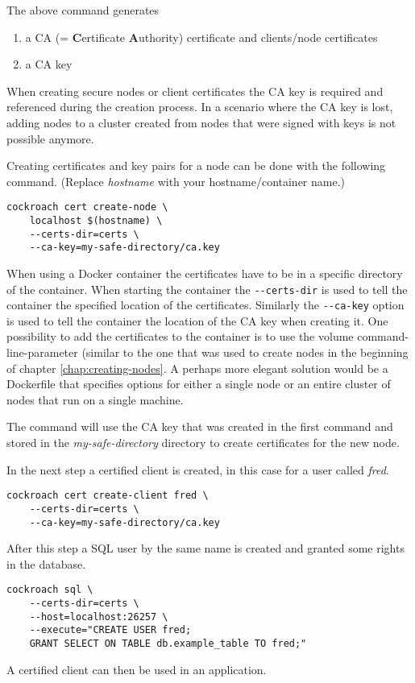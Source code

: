 The above command generates 
\begin{enumerate}
    \item a CA (= \textbf{C}ertificate \textbf{A}uthority) certificate and clients/node certificates
    \item a CA key 
\end{enumerate}

When creating secure nodes or client certificates the CA key is required and referenced during the creation process.
In a scenario where the CA key is lost, adding nodes to a cluster created from nodes that were signed with keys is not possible anymore.

\medskip
Creating certificates and key pairs for a node can be done with the following command. (Replace \emph{hostname} with your hostname/container name.)

\begin{verbatim}
cockroach cert create-node \ 
    localhost $(hostname) \
    --certs-dir=certs \
    --ca-key=my-safe-directory/ca.key
\end{verbatim}

When using a Docker container the certificates have to be in a specific directory of the container.
When starting the container the \verb|--certs-dir| is used to tell the container the specified location of the certificates. Similarly the \verb|--ca-key| option is used to tell the container the location of the CA key when creating it.
One possibility to add the certificates to the container is to use the volume command-line-parameter (similar to the one that was used to create nodes in the beginning of chapter \ref{chap:creating-nodes}.
A perhaps more elegant solution would be a Dockerfile that specifies options for either a single node or an entire cluster of nodes that run on a single machine.

The command will use the CA key that was created in the first command and stored in the \emph{my-safe-directory} directory to create certificates for the new node.

\bigskip
In the next step a certified client is created, in this case for a user called \emph{fred}.

\begin{verbatim}
cockroach cert create-client fred \ 
    --certs-dir=certs \
    --ca-key=my-safe-directory/ca.key
\end{verbatim}

After this step a SQL user by the same name is created and granted some rights in the database.
\cite{cockroach-security}

\begin{verbatim}
cockroach sql \
    --certs-dir=certs \
    --host=localhost:26257 \
    --execute="CREATE USER fred;
    GRANT SELECT ON TABLE db.example_table TO fred;"
\end{verbatim}

A certified client can then be used in an application.
